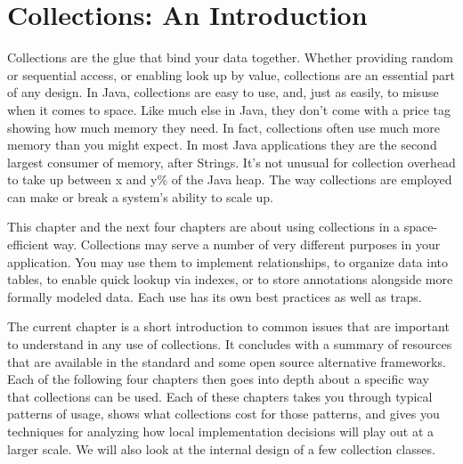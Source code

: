 \chapter{Collections: An Introduction}
\label{chapter:brief-introduction-collections}

Collections are the glue that bind your data together.  Whether
providing random or sequential access, or enabling
look up by value, collections are an essential part of any
design. In Java, collections are easy to use, and, just as easily, to misuse when
it comes to space. Like much else in Java, they don't come with a price tag
showing how much memory they need. In fact, collections
often use much more memory than you might expect. In most Java applications they are the second largest consumer of memory, after
Strings. It's not unusual for collection overhead to take up between x and y\%
of the Java heap. The way collections are employed can make
or break a system's ability to scale up.

This chapter and the next four chapters are about using
collections in a space-efficient way. 
Collections may serve a number of very
different purposes in your application. You may use them to implement
relationships, to organize data into tables, to enable quick lookup via indexes, or
to store annotations alongside more formally modeled data. Each use
has its own best practices as well as traps. 

The current chapter
is a short introduction to common issues that are important to understand in
any use of collections. It concludes with a summary of resources
that are available in the standard and some open source alternative
frameworks. Each of the following four
chapters then goes into depth about a specific way that collections can be
used. Each of these chapters takes
you through typical patterns of usage, shows what collections cost for those patterns,
and gives you techniques for analyzing how local implementation decisions will play out at a larger scale. 
We will also look at the internal design of a few collection
classes.

%

